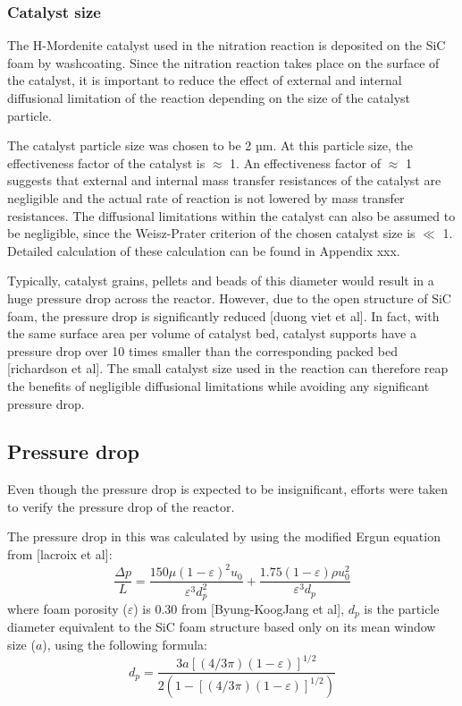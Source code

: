 \subsubsection{Catalyst size}
The H-Mordenite catalyst used in the nitration reaction is deposited on the SiC foam by washcoating. Since the nitration reaction takes place on the surface of the catalyst, it is important to reduce the effect of external and internal diffusional limitation of the reaction depending on the size of the catalyst particle.  

The catalyst particle size was chosen to be 2 µm. At this particle size, the effectiveness factor of the catalyst is $\approx$ 1. An effectiveness factor of $\approx$ 1 suggests that external and internal mass transfer resistances of the catalyst are negligible and the actual rate of reaction is not lowered by mass transfer resistances. The diffusional limitations within the catalyst can also be assumed to be negligible, since the Weisz-Prater criterion of the chosen catalyst size is $\ll$ 1. Detailed calculation of these calculation can be found in Appendix xxx.

Typically, catalyst grains, pellets and beads of this diameter would result in a huge pressure drop across the reactor. However, due to the open structure of SiC foam, the pressure drop is significantly reduced [duong viet et al]. In fact, with the same surface area per volume of catalyst bed, catalyst supports have a pressure drop over 10 times smaller than the corresponding packed bed [richardson et al]. The small catalyst size used in the reaction can therefore reap the benefits of negligible diffusional limitations while avoiding any significant pressure drop.

\subsection{Pressure drop}
Even though the pressure drop is expected to be insignificant, efforts were taken to verify the pressure drop of the reactor.

The pressure drop in this was calculated by using the modified Ergun equation from [lacroix et al]: 
\begin{equation}
    \frac{\Delta p}{L} = \frac{150 \mu (1- \varepsilon)^2 u_0}{\varepsilon^3 d_p^2} + \frac{1.75(1-\varepsilon)\rho u_0^2}{\varepsilon^3 d_p}
    \label{eqn:ergun}
\end{equation}
where foam porosity ($\varepsilon$) is 0.30 from [Byung-KoogJang et al], $d_p$ is the particle diameter equivalent to the SiC foam structure based only on its mean window size ($a$), using the following formula:
\begin{equation}
d_{p}=\frac{3a[(4 / 3 \pi)(1-\varepsilon)]^{1 / 2}}{2(1-[(4 / 3 \pi)(1-\varepsilon)]^{1 / 2})}
\end{equation}

